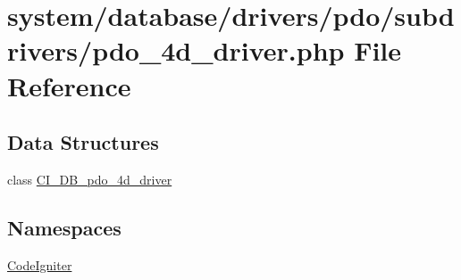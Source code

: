 \hypertarget{pdo__4d__driver_8php}{}\section{system/database/drivers/pdo/subdrivers/pdo\+\_\+4d\+\_\+driver.php File Reference}
\label{pdo__4d__driver_8php}
\subsection*{Data Structures}
\begin{DoxyCompactItemize}
\item 
class \mbox{\hyperlink{class_c_i___d_b__pdo__4d__driver}{C\+I\+\_\+\+D\+B\+\_\+pdo\+\_\+4d\+\_\+driver}}
\end{DoxyCompactItemize}
\subsection*{Namespaces}
\begin{DoxyCompactItemize}
\item 
 \mbox{\hyperlink{namespace_code_igniter}{Code\+Igniter}}
\end{DoxyCompactItemize}
